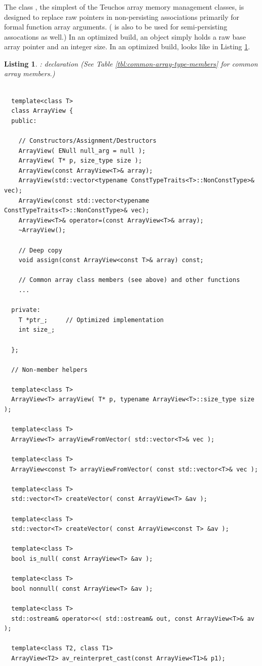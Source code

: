 \documentclass[pdf,ps2pdf,11pt]{SANDreport}
\newtheorem{listing}{Listing}
\begin{document}
%
{}\subsubsection{}
%

The class {}, the simplest of the Teuchos array
memory management classes, is designed to replace raw pointers in
non-persisting associations primarily for formal function array
arguments.  ({} is also to be used for semi-persisting
assocations as well.)  In an optimized build, an {}
object simply holds a raw base array pointer and an integer size.  In
an optimized build, {} looks like in Listing
{}\ref{listing:ArrayView}.

{}\begin{listing}: {} declaration (See
Table {}\ref{tbl:common-array-type-members} for common array members.)
\label{listing:ArrayView}
{\small\begin{verbatim}

  template<class T>
  class ArrayView {
  public:

    // Constructors/Assignment/Destructors
    ArrayView( ENull null_arg = null );
    ArrayView( T* p, size_type size );
    ArrayView(const ArrayView<T>& array);
    ArrayView(std::vector<typename ConstTypeTraits<T>::NonConstType>& vec);
    ArrayView(const std::vector<typename ConstTypeTraits<T>::NonConstType>& vec);
    ArrayView<T>& operator=(const ArrayView<T>& array);
    ~ArrayView();

    // Deep copy  
    void assign(const ArrayView<const T>& array) const;

    // Common array class members (see above) and other functions
    ...

  private:
    T *ptr_;     // Optimized implementation
    int size_;

  };

  // Non-member helpers

  template<class T>
  ArrayView<T> arrayView( T* p, typename ArrayView<T>::size_type size );

  template<class T>
  ArrayView<T> arrayViewFromVector( std::vector<T>& vec );

  template<class T>
  ArrayView<const T> arrayViewFromVector( const std::vector<T>& vec );

  template<class T>
  std::vector<T> createVector( const ArrayView<T> &av );

  template<class T>
  std::vector<T> createVector( const ArrayView<const T> &av );

  template<class T>
  bool is_null( const ArrayView<T> &av );

  template<class T>
  bool nonnull( const ArrayView<T> &av );

  template<class T>
  std::ostream& operator<<( std::ostream& out, const ArrayView<T>& av );

  template<class T2, class T1>
  ArrayView<T2> av_reinterpret_cast(const ArrayView<T1>& p1);

\end{verbatim}}
\end{listing}
\end{document}
